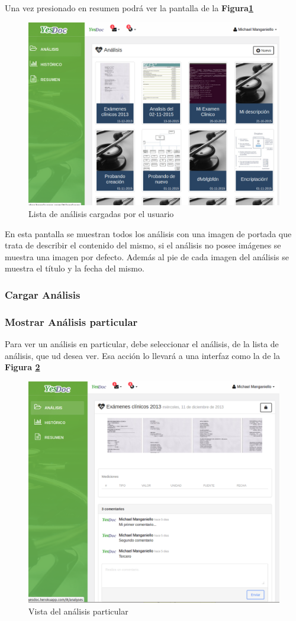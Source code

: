Una vez presionado en resumen podrá ver la pantalla de la \textbf{Figura\ref{mu-listar_analisis}}


\begin{figure}
	\centering
	\includegraphics[width=.8\textwidth]{img/manual_de_usuario/listar_analisis}
	\caption{Lista de análisis cargadas por el usuario}
	\label{mu-listar_analisis}
\end{figure}
 
 
 En esta pantalla se muestran todos los análisis con una imagen de portada que trata de describir el contenido del mismo, si el análisis no posee imágenes se muestra una imagen por defecto. Además al pie de cada imagen del análisis se muestra el título y la fecha del mismo.
 
 \subsubsection{Cargar Análisis}
 \subsubsection{Mostrar Análisis particular}
Para ver un análisis en particular, debe seleccionar el análisis, de la lista de análisis, que ud desea ver. Esa acción lo llevará a una interfaz como la de la \textbf{Figura \ref{mu-analisis_particular}}
\begin{figure}
	\centering
	\includegraphics[width=.8\textwidth]{img/manual_de_usuario/analisis_particular}
	\caption{Vista del análisis particular}
	\label{mu-analisis_particular}
\end{figure}
